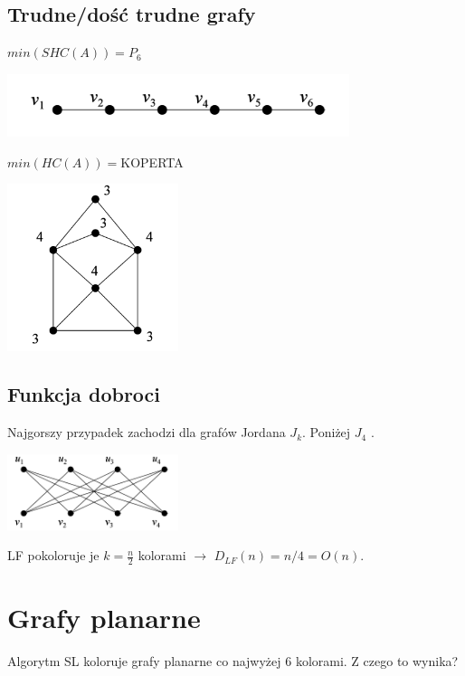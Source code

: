 \documentclass{article}
\begin{document}
\subsection{Trudne/dość trudne grafy}
 $min (SHC(A)) = P_6$ 
\begin{center}
\includegraphics[width=10cm]{P6}
\end{center}
 $min (HC(A)) = $KOPERTA
\begin{center}
\includegraphics[width=5cm]{Koperta}
\end{center}

\subsection{Funkcja dobroci}
Najgorszy przypadek zachodzi dla grafów Jordana $J_k$.  Poniżej $J_4$ .
\begin{center}
\includegraphics[width=5cm]{Jordan}
\end{center}
LF pokoloruje je $k = \frac{n}{2}$ kolorami $\rightarrow$ $D_{LF}(n) = n/4 = O(n)$.

\section{Grafy planarne}
Algorytm SL koloruje grafy planarne co najwyżej 6 kolorami. Z czego to wynika?
\end{document}
